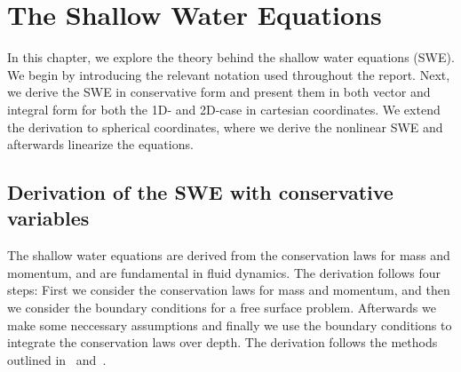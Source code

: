 \chapter{The Shallow Water Equations}\label{ch:theory}
In this chapter, we explore the theory behind the shallow water equations (SWE).
We begin by introducing the relevant notation used throughout the report.
Next, we derive the SWE in conservative form and present them in both vector and integral form for both the 1D- and 2D-case in cartesian coordinates.
We extend the derivation to spherical coordinates, where we derive the nonlinear SWE and afterwards linearize the equations.



\section{Derivation of the SWE with conservative variables}
The shallow water equations are derived from the conservation laws for mass and momentum, and are fundamental in fluid dynamics.
The derivation follows four steps: First we consider the conservation laws for mass and momentum, and then we consider the boundary conditions for a free surface problem.
Afterwards we make some neccessary assumptions and finally we use the boundary conditions to integrate the conservation laws over depth.
The derivation follows the methods outlined in~\cite{Toro2001-Shock} and~\cite{Vreugdenhil1994}.


